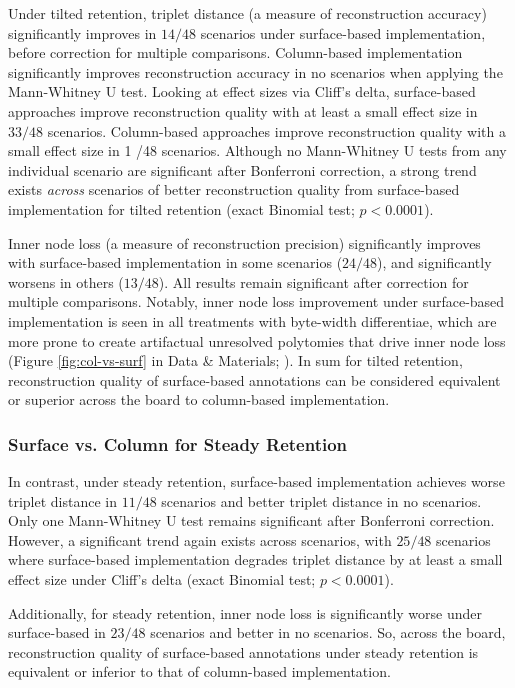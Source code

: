Under tilted retention, triplet distance (a measure of reconstruction accuracy) significantly improves in $14 / 48$ scenarios under surface-based implementation, before correction for multiple comparisons.
Column-based implementation significantly improves reconstruction accuracy in no scenarios when applying the Mann-Whitney U test.
Looking at effect sizes via Cliff's delta, surface-based approaches improve reconstruction quality with at least a small effect size in $33 / 48$ scenarios.
Column-based approaches improve reconstruction quality with a small effect size in 1 /48 scenarios.
Although no Mann-Whitney U tests from any individual scenario are significant after Bonferroni correction, a strong trend exists \textit{across} scenarios of better reconstruction quality from surface-based implementation for tilted retention (exact Binomial test; $p < 0.0001$).

Inner node loss (a measure of reconstruction precision) significantly improves with surface-based implementation in some scenarios ($24 / 48$), and significantly worsens in others ($13 / 48$).
All results remain significant after correction for multiple comparisons.
Notably, inner node loss improvement under surface-based implementation is seen in all treatments with byte-width differentiae, which are more prone to create artifactual unresolved polytomies that drive inner node loss (Figure \ref{fig:col-vs-surf} in Data \& Materials; \citep{moreno2024supplemental}).
In sum for tilted retention, reconstruction quality of surface-based annotations can be considered equivalent or superior across the board to column-based implementation.

\subsubsection{Surface vs. Column for Steady Retention}

In contrast, under steady retention, surface-based implementation achieves worse triplet distance in $11 / 48$ scenarios and better triplet distance in no scenarios.
Only one Mann-Whitney U test remains significant after Bonferroni correction.
However, a significant trend again exists across scenarios, with $25 / 48$ scenarios where surface-based implementation degrades triplet distance by at least a small effect size under Cliff's delta (exact Binomial test; $p < 0.0001$).

Additionally, for steady retention, inner node loss is significantly worse under surface-based in $23 / 48$ scenarios and better in no scenarios.
So, across the board, reconstruction quality of surface-based annotations under steady retention is equivalent or inferior to that of column-based implementation.


